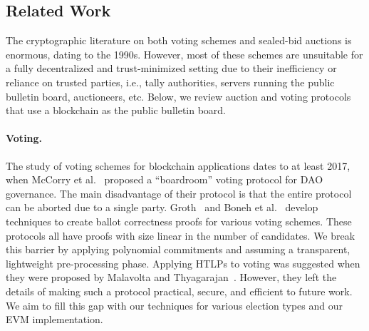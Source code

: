 \subsection{Related Work}

The cryptographic literature on both voting schemes and sealed-bid auctions is enormous, dating to the 1990s. However, most of these schemes are unsuitable for a fully decentralized and trust-minimized setting due to their inefficiency or reliance on trusted parties, i.e., tally authorities, servers running the public bulletin board, auctioneers, etc. Below, we review auction and voting protocols that use a blockchain as the public bulletin board. 

\paragraph{Voting.} 
The study of voting schemes for blockchain applications dates to at least 2017, when McCorry et al.~\cite{mccorry2017smart} proposed a ``boardroom'' voting protocol for DAO governance.
The main disadvantage of their protocol is that the entire protocol can be aborted due to a single party. Groth~\cite{groth2005voting} and Boneh et al.~\cite{boneh2023arithmetic} develop techniques to create ballot correctness proofs for various voting schemes. These protocols all have proofs with size linear in the number of candidates. We break this barrier by applying polynomial commitments and assuming a transparent, lightweight pre-processing phase. Applying HTLPs to voting was suggested when they were proposed by Malavolta and Thyagarajan~\cite{malavolta2019homomorphic}. However, they left the details of making such a protocol practical, secure, and efficient to future work. We aim to fill this gap with our techniques for various election types and our EVM implementation.

